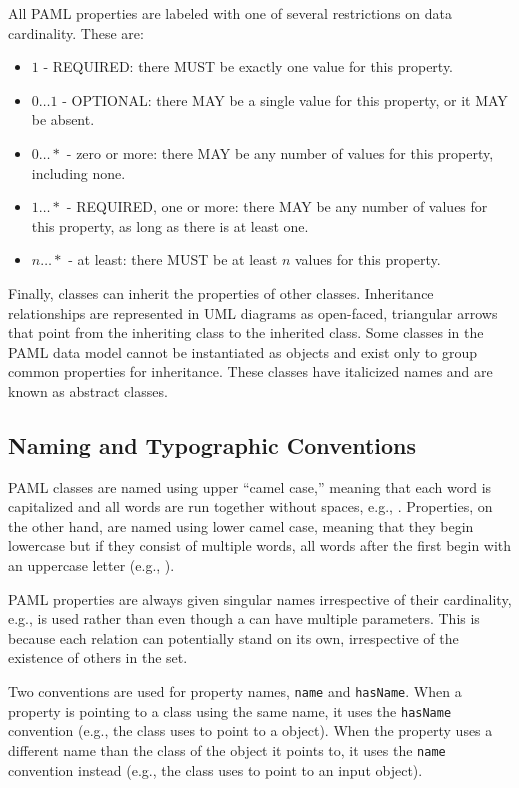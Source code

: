 All PAML properties are labeled with one of several restrictions on data cardinality. These are:

\begin{itemize}

\item $1$ - REQUIRED: there MUST be exactly one value for this property.

\item $0 \ldots 1$ - OPTIONAL: there MAY be a single value for this property, or it MAY be absent.

\item $0 \ldots *$ - zero or more: there MAY be any number of values for this property, including none.

\item $1 \ldots *$ - REQUIRED, one or more: there MAY be any number of values for this property, as long as there is at least one.

\item $n \ldots *$ - at least: there MUST be at least $n$ values for this property.

\end{itemize}

Finally, classes can inherit the properties of other classes. Inheritance relationships are represented in UML diagrams as open-faced, triangular arrows that point from the inheriting class to the inherited class. Some classes in the PAML data model cannot be instantiated as objects and exist only to group common properties for inheritance. These classes have italicized names and are known as abstract classes.

\subsection{Naming and Typographic Conventions}
\label{sec:nameconventions}

PAML classes are named using upper ``camel case,'' meaning that each word is capitalized and all words are run together without spaces, e.g., .
Properties, on the other hand, are named using lower camel case, meaning that they begin lowercase but if they consist of multiple words, all words after the first begin with an uppercase letter (e.g., ).

PAML properties are always given singular names irrespective of their cardinality, e.g.,  is used rather than  even though a  can have multiple parameters.
This is because each relation can potentially stand on its own, irrespective of the existence of others in the set.

Two conventions are used for property names, {\tt name} and {\tt hasName}.  
When a property is pointing to a class using the same name, it uses the {\tt hasName} convention (e.g., the  class uses  to point to a  object).
When the property uses a different name than the class of the object it points to, it uses the {\tt name} convention instead (e.g., the  class uses  to point to an input  object).
